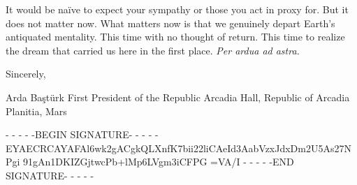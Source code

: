 It would be naïve to expect your sympathy or those you act in proxy for. But it does not matter now. What matters now is that we genuinely depart Earth's antiquated mentality. This time with no thought of return. This time to realize the dream that carried us here in the first place. {\it Per ardua ad astra.}

Sincerely, 

\hskip 1cm 
   
Arda Baştürk
First President of the Republic
Arcadia Hall, Republic of Arcadia Planitia, Mars

- - - - -BEGIN SIGNATURE- - - - -
EYAECRCAYAFAl6wk2gACgkQLXnfK7bii22liCAeId3AabVzxJdxDm2U5As27NPgi
91gAn1DKIZGjtwcPb+lMp6LVgm3iCFPG
=VA/I
- - - - -END SIGNATURE- - - - -
\stoplines

